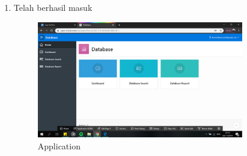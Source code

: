 \begin{enumerate}
\newpage
\item Telah berhasil masuk
    \begin{figure}[!htbp]
    \centering
    \includegraphics[width=9cm]{picture/14.png}
    \caption{Application}
    \end{figure}

    
    
\end{enumerate}